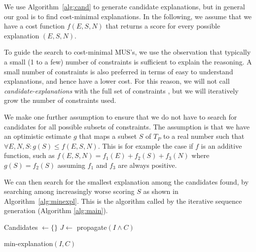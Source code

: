 We use Algorithm~\ref{alg:cand} to generate candidate explanations, but in general our goal is to find cost-minimal explanations. In the following, we assume that we have a cost function $f(E, S, N)$ that returns a score for every possible explanation $(E, S, N)$. 

To guide the search to cost-minimal MUS's, we use the observation that typically a small (1 to a few) number of constraints is sufficient to explain the reasoning. A small number of constraints is also preferred in terms of easy to understand explanations, and hence have a lower cost. For this reason, we will  not call \textit{candidate-explanations} with the full set of constraints \allconstraints, but we will iteratively grow the number of constraints used. 

We make one further assumption to ensure that we do not have to search for candidates for all possible subsets of constraints. The assumption is that we have an optimistic estimate $g$ that maps a subset $S$ of $T_P$ to a real number such that  $\forall E, N, S: g(S) \leq f(E, S, N)$. This is for example the case if $f$ is an additive function, such as $f(E, S, N) = f_1(E) + f_2(S) + f_3(N)$ where $g(S) = f_2(S)$ assuming $f_1$ and $f_3$ are always positive.

We can then search for the smallest explanation among the candidates found, by searching among increasingly worse scoring $S$ as shown in Algorithm~\ref{alg:minexpl}. This is the algorithm called by the iterative sequence generation (Algorithm \ref{alg:main}).

\begin{algorithm}


  Candidates $\gets \{\}$\;
  $J \gets$ propagate$(I \wedge C)$\;
\caption{min-explanation$(I,C)$}
\label{alg:minexpl}
\end{algorithm}

